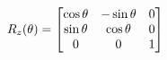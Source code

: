 \documentclass[preview]{standalone}
\begin{document}
\begin{align*}
\special{dvisvgm:raw <g id='unique000'>}R_{z}(\theta) = \begin{bmatrix} \cos\theta & -\sin\theta & 0 \\ \sin\theta & \cos\theta & 0 \\ 0 & 0 & 1 \end{bmatrix}\special{dvisvgm:raw </g>}
\end{align*}
\end{document}
